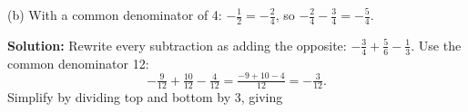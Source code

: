 \documentclass[12pt]{article}
\begin{document}
(b) With a common denominator of 4: $-\tfrac{1}{2} = -\tfrac{2}{4}$, so
$-\tfrac{2}{4} - \tfrac{3}{4} = -\tfrac{5}{4}$. 


\textbf{Solution:} Rewrite every subtraction as adding the opposite:
$-\tfrac{3}{4} + \tfrac{5}{6} - \tfrac{1}{3}$. Use the common denominator 12:
\[ -\tfrac{9}{12} + \tfrac{10}{12} - \tfrac{4}{12} = \tfrac{-9 + 10 - 4}{12} = -\tfrac{3}{12}. \]
Simplify by dividing top and bottom by 3, giving 
\end{document}

